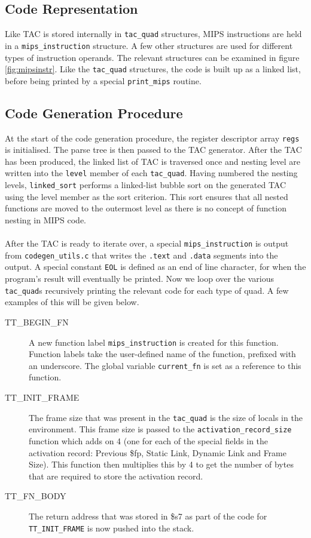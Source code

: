 \subsection{Code Representation}
Like TAC is stored internally in \verb!tac_quad! structures, MIPS instructions are held in a \verb!mips_instruction! structure. A few other structures are used for different types of instruction operands. The relevant structures can be examined in figure \ref{fig:mipsinstr}. Like the \verb!tac_quad! structures, the code is built up as a linked list, before being printed by a special \verb!print_mips! routine.

\subsection{Code Generation Procedure}
At the start of the code generation procedure, the register descriptor array \verb!regs! is initialised. The parse tree is then passed to the TAC generator. After the TAC has been produced, the linked list of TAC is traversed once and nesting level are written into the \verb!level! member of each \verb!tac_quad!. Having numbered the nesting levels, \verb!linked_sort! performs a linked-list bubble sort on the generated TAC using the level member as the sort criterion. This sort ensures that all nested functions are moved to the outermost level as there is no concept of function nesting in MIPS code.
\ \\ \ \\
After the TAC is ready to iterate over, a special \verb!mips_instruction! is output from \verb!codegen_utils.c! that writes the \verb!.text! and \verb!.data! segments into the output. A special constant \verb!EOL! is defined as an end of line character, for when the program's result will eventually be printed. Now we loop over the various \verb!tac_quad!s recursively printing the relevant code for each type of quad. A few examples of this will be given below.

\begin{description}
	\item[TT\_BEGIN\_FN] A new function label \verb!mips_instruction! is created for this function. Function labels take the user-defined name of the function, prefixed with an underscore. The global variable \verb!current_fn! is set as a reference to this function.
	\item[TT\_INIT\_FRAME] The frame size that was present in the \verb!tac_quad! is the size of locals in the environment. This frame size is passed to the \verb!activation_record_size! function which adds on 4 (one for each of the special fields in the activation record: Previous \$fp, Static Link, Dynamic Link and Frame Size). This function then multiplies this by 4 to get the number of bytes that are required to store the activation record.
	\item[TT\_FN\_BODY] The return address that was stored in \$s7 as part of the code for \verb!TT_INIT_FRAME! is now pushed into the stack.
	\item[]
\end{description}

